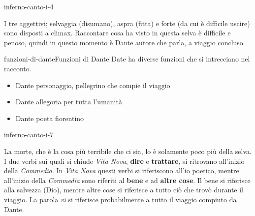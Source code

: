 \documentclass[preview]{standalone}
\begin{document}
\begin{snippet}{inferno-canto-i-4}

    I tre aggettivi; selvaggia (disumano), aspra (fitta) e forte (da cui è difficile uscire)
    sono disposti a climax. Raccontare cosa ha visto in questa selva è difficile e penoso,
    quindi in questo momento è Dante autore che parla, a viaggio concluso.
\end{snippet}

\begin{snippetnote}{funzioni-di-dante}{Funzioni di Dante}
    Date ha diverse funzioni che si intrecciano nel racconto.
    \begin{itemize}
        \item Dante personaggio, pellegrino che compie il viaggio
        \item Dante allegoria per tutta l'umanità
        \item Dante poeta fiorentino
    \end{itemize}
\end{snippetnote}

\begin{snippet}{inferno-canto-i-7}
    
    La morte, che è la cosa più terribile che ci sia, lo è solamente poco più della selva.
    \\
    I due verbi sui quali si chiude \textit{Vita Nova},
    \textbf{dire} e \textbf{trattare}, si ritrovano all'inizio della \textit{Commedia}.
    In \textit{Vita Nova} questi verbi si riferiscono all'io poetico, mentre all'inizio della \textit{Commedia}
    sono riferiti al \textbf{bene} e ad \textbf{altre cose}.
    Il bene si riferisce alla salvezza (Dio), mentre altre cose si riferisce a tutto ciò che trovò durante il viaggio.
    La parola \textit{vi} si riferisce probabilmente a tutto il viaggio compiuto da Dante.
\end{snippet}
\end{document}
